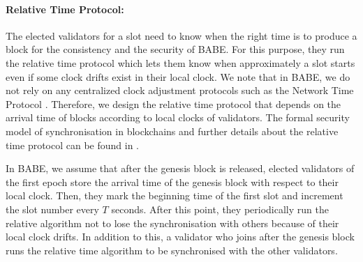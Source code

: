 


\paragraph{Relative Time Protocol:}

The elected validators for a slot need to know when the right time is to produce a block for the consistency and the security of BABE.
For this purpose, they run the relative time protocol which lets them know when approximately a slot starts even if some clock drifts exist in their local clock. We note that in BABE, we do not rely on any centralized clock adjustment protocols such as the Network Time Protocol \cite{ntp}. 
Therefore, we design the relative time protocol that depends on the arrival time of blocks according to local clocks of validators. 
The formal security model of synchronisation in blockchains and further details about the relative time protocol can be found in \cite{consensusonclock}.

In BABE, we assume that after the genesis block is released, elected validators of the first epoch store the arrival time of the genesis block with respect to their local clock. Then, they mark the beginning
 time of the first slot and increment
the slot number every $ T $ seconds. After this point,  they periodically run the relative algorithm not to lose the synchronisation with others because of their local clock drifts.  In addition to this, a validator who
joins after the genesis block runs the relative time algorithm to be synchronised with the other validators.

